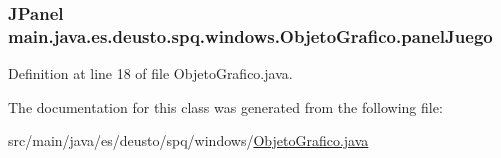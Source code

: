 \subsubsection[{\texorpdfstring{panel\+Juego}{panelJuego}}]{\setlength{\rightskip}{0pt plus 5cm}J\+Panel main.\+java.\+es.\+deusto.\+spq.\+windows.\+Objeto\+Grafico.\+panel\+Juego\hspace{0.3cm}{\ttfamily [protected]}}\hypertarget{classmain_1_1java_1_1es_1_1deusto_1_1spq_1_1windows_1_1_objeto_grafico_a59e4c02190cec52f781b454584c2566a}{}\label{classmain_1_1java_1_1es_1_1deusto_1_1spq_1_1windows_1_1_objeto_grafico_a59e4c02190cec52f781b454584c2566a}


Definition at line 18 of file Objeto\+Grafico.\+java.



The documentation for this class was generated from the following file\+:\begin{DoxyCompactItemize}
\item 
src/main/java/es/deusto/spq/windows/\hyperlink{_objeto_grafico_8java}{Objeto\+Grafico.\+java}\end{DoxyCompactItemize}
